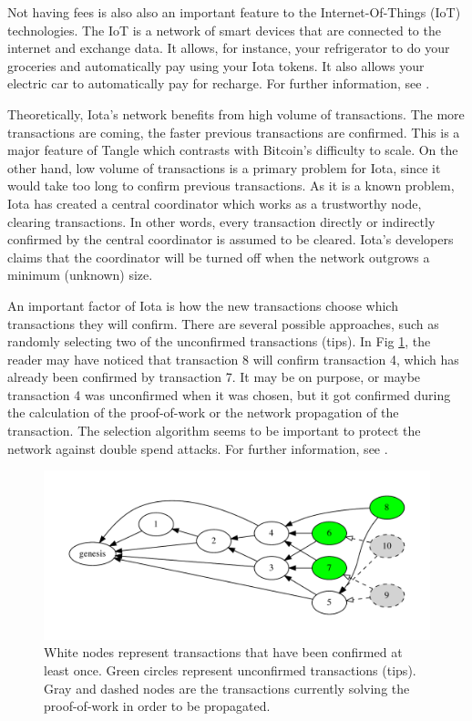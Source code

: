 Not having fees is also also an important feature to the Internet-Of-Things (IoT) technologies. The IoT is a network of smart devices that are connected to the internet and exchange data. It allows, for instance, your refrigerator to do your groceries and automatically pay using your Iota tokens. It also allows your electric car to automatically pay for recharge. For further information, see \cite{fleisch2010internet}.

Theoretically, Iota's network benefits from high volume of transactions. The more transactions are coming, the faster previous transactions are confirmed. This is a major feature of Tangle which contrasts with Bitcoin's difficulty to scale. On the other hand, low volume of transactions is a primary problem for Iota, since it would take too long to confirm previous transactions. As it is a known problem, Iota has created a central coordinator which works as a trustworthy node, clearing transactions. In other words, every transaction directly or indirectly confirmed by the central coordinator is assumed to be cleared. Iota's developers claims that the coordinator will be turned off when the network outgrows a minimum (unknown) size.

An important factor of Iota is how the new transactions choose which transactions they will confirm. There are several possible approaches, such as randomly selecting two of the unconfirmed transactions (tips). In Fig \ref{fig-tangle-example}, the reader may have noticed that transaction 8 will confirm transaction 4, which has already been confirmed by transaction 7. It may be on purpose, or maybe transaction 4 was unconfirmed when it was chosen, but it got confirmed during the calculation of the proof-of-work or the network propagation of the transaction. The selection algorithm seems to be important to protect the network against double spend attacks. For further information, see \cite{tangle2016}.

\begin{figure}[ht]
\centering\includegraphics[width=\textwidth]{./images01/fig-tangle-example.pdf}
\caption{White nodes represent transactions that have been confirmed at least once. Green circles represent unconfirmed transactions (tips). Gray and dashed nodes are the transactions currently solving the proof-of-work in order to be propagated.\label{fig-tangle-example}}
\end{figure}

